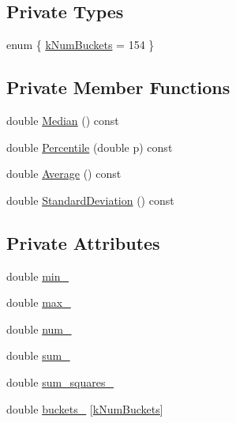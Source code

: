 \subsection*{Private Types}
\begin{DoxyCompactItemize}
\item 
enum \{ \hyperlink{classleveldb_1_1_histogram_a85ac6d5944226d81702ae69147996ec8a6ea13d53f7e3910a6b7c293d48d0a0da}{k\+Num\+Buckets} = 154
 \}
\end{DoxyCompactItemize}
\subsection*{Private Member Functions}
\begin{DoxyCompactItemize}
\item 
double \hyperlink{classleveldb_1_1_histogram_acb3844fbaeeed8998843a4314904121a}{Median} () const 
\item 
double \hyperlink{classleveldb_1_1_histogram_a58aaefb11df105f26e9da73148b85a47}{Percentile} (double p) const 
\item 
double \hyperlink{classleveldb_1_1_histogram_a72836120dc9000bd63048c2b53f21a64}{Average} () const 
\item 
double \hyperlink{classleveldb_1_1_histogram_a5eaea641e2c7c95364c98f5314e37d77}{Standard\+Deviation} () const 
\end{DoxyCompactItemize}
\subsection*{Private Attributes}
\begin{DoxyCompactItemize}
\item 
double \hyperlink{classleveldb_1_1_histogram_aa074ae70ad7abbdaf12b97282eb1b700}{min\+\_\+}
\item 
double \hyperlink{classleveldb_1_1_histogram_afd840834f24cdc85ee08fc6158495327}{max\+\_\+}
\item 
double \hyperlink{classleveldb_1_1_histogram_a3ec0c6cddbe0b040ee05d938f716e9b2}{num\+\_\+}
\item 
double \hyperlink{classleveldb_1_1_histogram_a5a2588e02237189eca8a1b2e8601e961}{sum\+\_\+}
\item 
double \hyperlink{classleveldb_1_1_histogram_a10c67c4ce34a29c17d000927f730632e}{sum\+\_\+squares\+\_\+}
\item 
double \hyperlink{classleveldb_1_1_histogram_a332d20f5b4811483f443a0fffde60a27}{buckets\+\_\+} \mbox{[}\hyperlink{classleveldb_1_1_histogram_a85ac6d5944226d81702ae69147996ec8a6ea13d53f7e3910a6b7c293d48d0a0da}{k\+Num\+Buckets}\mbox{]}
\end{DoxyCompactItemize}
